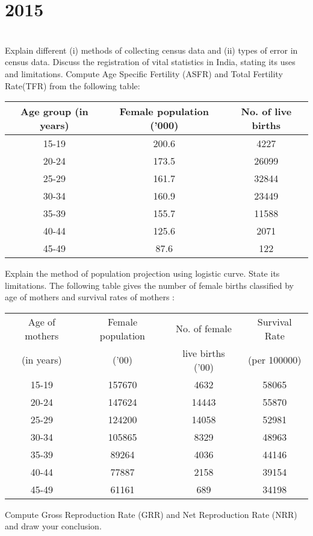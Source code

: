 \section*{2015}
\vspace{-.5cm}
\hrulefill \smallskip\\
 Explain different (i) methods of collecting census data and (ii) types of error in census data.
\myline
{} Discuss the registration of vital statistics in India, stating its uses and limitations.
\myline
{} Compute Age Specific Fertility (ASFR) and Total Fertility Rate(TFR) from the following table:
\begin{center}
    \begin{tabular}{| c | c | c|} \hline
    Age group (in years) &  Female population ('000) & No. of live births\\ \hline
    15-19 & 200.6 & 4227  \\ 
    20-24 & 173.5 & 26099\\ 
    25-29 & 161.7 & 32844 \\ 
    30-34 & 160.9 & 23449 \\ 
    35-39 & 155.7 & 11588  \\ 
    40-44 & 125.6 & 2071  \\ 
    45-49 & 87.6 & 122 \\ \hline
    \end{tabular}
\end{center}
 Explain the method of population projection using logistic curve. State its limitations.
\myline
{} The following table gives the number of female births classified by age of mothers and survival rates of mothers :
\begin{center}
    \begin{tabular}{| c | c | c| c |} \hline
    Age of mothers  &  Female population & No. of female & Survival Rate \vspace{-1.5ex}\\ 
    (in years) &  ('00) & live births ('00) & (per 100000) \\ \hline
    15-19 & 157670 & 4632 & 58065  \\ 
    20-24 & 147624 & 14443 & 55870\\ 
    25-29 & 124200 & 14058 & 52981\\ 
    30-34 & 105865 & 8329  & 48963\\ 
    35-39 & 89264 & 4036  & 44146 \\ 
    40-44 & 77887 & 2158 & 39154\\ 
    45-49 & 61161 & 689 & 34198\\ \hline
    \end{tabular}
\end{center} Compute Gross Reproduction Rate (GRR) and Net Reproduction Rate (NRR) and draw your conclusion.